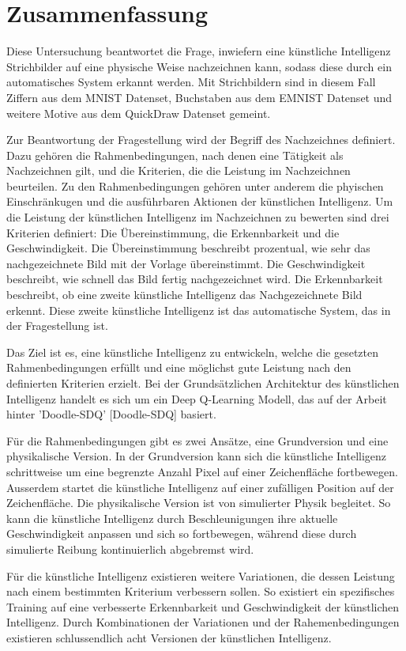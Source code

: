 \chapter{Zusammenfassung}
Diese Untersuchung beantwortet die Frage, inwiefern eine künstliche Intelligenz
Strichbilder auf eine physische Weise nachzeichnen kann, sodass diese durch ein
automatisches System erkannt werden. Mit Strichbildern sind in diesem
Fall Ziffern aus dem MNIST Datenset, Buchstaben aus dem EMNIST Datenset und
weitere Motive aus dem QuickDraw Datenset gemeint. 

Zur Beantwortung der Fragestellung wird der Begriff des Nachzeichnes definiert.
Dazu gehören die Rahmenbedingungen, nach denen eine Tätigkeit als Nachzeichnen
gilt, und die Kriterien, die die Leistung im Nachzeichnen beurteilen. Zu den
Rahmenbedingungen gehören unter anderem die phyischen Einschränkugen und die
ausführbaren Aktionen der künstlichen Intelligenz. Um die Leistung der
künstlichen Intelligenz im Nachzeichnen zu bewerten sind drei Kriterien
definiert: Die Übereinstimmung, die Erkennbarkeit und die Geschwindigkeit. Die
Übereinstimmung beschreibt prozentual, wie sehr das nachgezeichnete Bild mit der
Vorlage übereinstimmt. Die Geschwindigkeit beschreibt, wie schnell das Bild
fertig nachgezeichnet wird. Die Erkennbarkeit beschreibt, ob eine zweite
künstliche Intelligenz das Nachgezeichnete Bild erkennt. Diese zweite künstliche
Intelligenz ist das automatische System, das in der Fragestellung  ist.

Das Ziel ist es, eine künstliche Intelligenz zu entwickeln, welche die gesetzten
Rahmenbedingungen erfüllt und eine möglichst gute Leistung nach den definierten
Kriterien erzielt. Bei der Grundsätzlichen Architektur des künstlichen
Intelligenz handelt es sich um ein Deep Q-Learning Modell, das auf der Arbeit
hinter 'Doodle-SDQ' [Doodle-SDQ] basiert.

Für die Rahmenbedingungen gibt es zwei Ansätze, eine Grundversion und eine
physikalische Version. In der Grundversion kann sich die künstliche Intelligenz
schrittweise um eine begrenzte Anzahl Pixel auf einer Zeichenfläche fortbewegen.
Ausserdem startet die künstliche Intelligenz auf einer zufälligen Position auf
der Zeichenfläche. Die physikalische Version ist von simulierter Physik
begleitet. So kann die künstliche Intelligenz durch Beschleunigungen ihre
aktuelle Geschwindigkeit anpassen und sich so fortbewegen, während diese durch
simulierte Reibung kontinuierlich abgebremst wird. 

Für die künstliche Intelligenz existieren weitere Variationen, die dessen
Leistung nach einem bestimmten Kriterium verbessern sollen. So existiert ein
spezifisches Training auf eine verbesserte Erkennbarkeit und Geschwindigkeit der
künstlichen Intelligenz. Durch Kombinationen der Variationen und der
Rahemenbedingungen existieren schlussendlich acht Versionen der künstlichen
Intelligenz.

